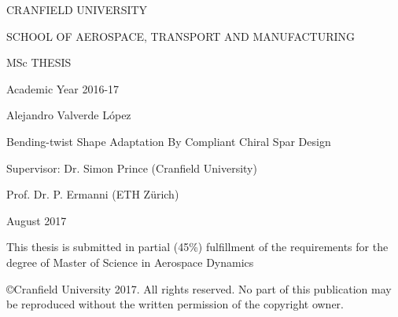 \pagebreak


\ClearDoublePageOrNot{\controlClearPage} %





\thispagestyle{empty}

\large \begin{center}


CRANFIELD UNIVERSITY

\vspace{15mm}

SCHOOL OF AEROSPACE, TRANSPORT AND MANUFACTURING

\vspace{12mm}

MSc THESIS

\vspace{12mm}

Academic Year 2016-17

\vspace{12mm} \Large

Alejandro Valverde L\'opez

\vspace{12mm}

Bending-twist Shape Adaptation By Compliant Chiral Spar Design

\vspace{12mm} \large

Supervisor: \hspace{20mm} Dr. Simon Prince (Cranfield University) %

\hspace{32mm} Prof. Dr. P. Ermanni (ETH Z\"urich)

\vspace{10mm}

August 2017

\vspace{5mm} \normalsize


This thesis is submitted in partial (45\%) fulfillment of the
requirements for the degree of Master of Science in Aerospace Dynamics

\vspace{5mm}

\copyright Cranfield University 2017. All rights reserved. No
part of this publication may be reproduced without the written
permission of the copyright owner.

\end{center}

\pagebreak


\ClearDoublePageOrNot{\controlClearPage} %



